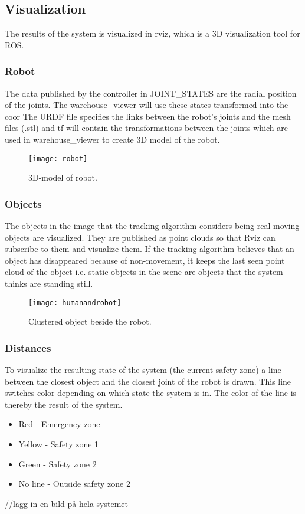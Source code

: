 \subsection{Visualization}

The results of the system is visualized in rviz, which is a 3D visualization tool for ROS. 

\subsubsection{Robot}
The data published by the controller in JOINT\_STATES are the radial position of the joints. The warehouse\_viewer will use these states transformed into the coor The URDF file specifies the links between the robot’s joints and the mesh files (.stl) and tf will contain the transformations between the joints which are used in warehouse\_viewer to create 3D model of the robot. 

\begin{figure}[H]
\begin{center}
\texttt{[image: robot]}
\caption{3D-model of robot.}

\end{center}
\end{figure}

\subsubsection{Objects}
The objects in the image that the tracking algorithm considers being real moving objects are visualized. They are published as point clouds so that Rviz can subscribe to them and visualize them. If the tracking algorithm believes that an object has disappeared because of non-movement, it keeps the last seen point cloud of the object i.e. static objects in the scene are objects that the system thinks are standing still. 

\begin{figure}[H]
\begin{center}
\texttt{[image: humanandrobot]}
\caption{Clustered object beside the robot.}

\end{center}
\end{figure}


\subsubsection{Distances}
To visualize the resulting state of the system (the current safety zone) a line between the closest object and the closest joint of the robot is drawn. This line switches color depending on which state the system is in. The color of the line is thereby the result of the system. 

\begin{itemize}
  \item Red - Emergency zone
  \item Yellow - Safety zone 1 
  \item Green - Safety zone 2
  \item No line - Outside safety zone 2 
\end{itemize}

//lägg in en bild på hela systemet

